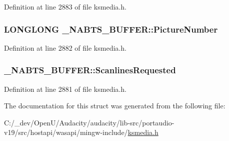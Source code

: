Definition at line 2883 of file ksmedia.\+h.

\subsubsection[{\texorpdfstring{Picture\+Number}{PictureNumber}}]{\setlength{\rightskip}{0pt plus 5cm}L\+O\+N\+G\+L\+O\+NG \+\_\+\+N\+A\+B\+T\+S\+\_\+\+B\+U\+F\+F\+E\+R\+::\+Picture\+Number}\hypertarget{struct___n_a_b_t_s___b_u_f_f_e_r_af670fb0f9e364e8120b31c543d2ffbc6}{}\label{struct___n_a_b_t_s___b_u_f_f_e_r_af670fb0f9e364e8120b31c543d2ffbc6}


Definition at line 2882 of file ksmedia.\+h.

\subsubsection[{\texorpdfstring{Scanlines\+Requested}{ScanlinesRequested}}]{ \+\_\+\+N\+A\+B\+T\+S\+\_\+\+B\+U\+F\+F\+E\+R\+::\+Scanlines\+Requested}\hypertarget{struct___n_a_b_t_s___b_u_f_f_e_r_a3810c7b645f084ec55572181bd6ccfc5}{}\label{struct___n_a_b_t_s___b_u_f_f_e_r_a3810c7b645f084ec55572181bd6ccfc5}


Definition at line 2881 of file ksmedia.\+h.



The documentation for this struct was generated from the following file\+:\begin{DoxyCompactItemize}
\item 
C\+:/\+\_\+dev/\+Open\+U/\+Audacity/audacity/lib-\/src/portaudio-\/v19/src/hostapi/wasapi/mingw-\/include/\hyperlink{ksmedia_8h}{ksmedia.\+h}\end{DoxyCompactItemize}
